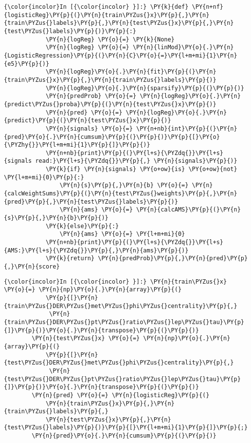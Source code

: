     \begin{Verbatim}[commandchars=\\\{\}]
{\color{incolor}In [{\color{incolor} }]:} \PY{k}{def} \PY{n+nf}{logisticReg}\PY{p}{(}\PY{n}{train\PYZus{}x}\PY{p}{,}\PY{n}{train\PYZus{}labels}\PY{p}{,}\PY{n}{test\PYZus{}x}\PY{p}{,}\PY{n}{test\PYZus{}labels}\PY{p}{)}\PY{p}{:}
            \PY{n}{logReg} \PY{o}{=} \PY{k}{None}
            \PY{n}{logReg} \PY{o}{=} \PY{n}{linMod}\PY{o}{.}\PY{n}{LogisticRegression}\PY{p}{(}\PY{n}{C}\PY{o}{=}\PY{l+m+mi}{1}\PY{n}{e5}\PY{p}{)}
            \PY{n}{logReg}\PY{o}{.}\PY{n}{fit}\PY{p}{(}\PY{n}{train\PYZus{}x}\PY{p}{,}\PY{n}{train\PYZus{}labels}\PY{p}{)}
            \PY{n}{logReg}\PY{o}{.}\PY{n}{sparsify}\PY{p}{(}\PY{p}{)}
            \PY{n}{predProb} \PY{o}{=} \PY{n}{logReg}\PY{o}{.}\PY{n}{predict\PYZus{}proba}\PY{p}{(}\PY{n}{test\PYZus{}x}\PY{p}{)}
            \PY{n}{pred} \PY{o}{=} \PY{n}{logReg}\PY{o}{.}\PY{n}{predict}\PY{p}{(}\PY{n}{test\PYZus{}x}\PY{p}{)}
            \PY{n}{signals} \PY{o}{=} \PY{n+nb}{int}\PY{p}{(}\PY{n}{pred}\PY{o}{.}\PY{n}{cumsum}\PY{p}{(}\PY{p}{)}\PY{p}{[}\PY{o}{\PYZhy{}}\PY{l+m+mi}{1}\PY{p}{]}\PY{p}{)}  
            \PY{n+nb}{print}\PY{p}{(}\PY{l+s}{\PYZdq{}}\PY{l+s}{signals read:}\PY{l+s}{\PYZdq{}}\PY{p}{,} \PY{n}{signals}\PY{p}{)}
            \PY{k}{if} \PY{n}{signals} \PY{o+ow}{is} \PY{o+ow}{not} \PY{l+m+mi}{0}\PY{p}{:}
                \PY{n}{s}\PY{p}{,}\PY{n}{b} \PY{o}{=} \PY{n}{calcWeightSums}\PY{p}{(}\PY{n}{test\PYZus{}weights}\PY{p}{,}\PY{n}{pred}\PY{p}{,}\PY{n}{test\PYZus{}labels}\PY{p}{)}
                \PY{n}{ams} \PY{o}{=} \PY{n}{calcAMS}\PY{p}{(}\PY{n}{s}\PY{p}{,}\PY{n}{b}\PY{p}{)}
            \PY{k}{else}\PY{p}{:}
                \PY{n}{ams} \PY{o}{=} \PY{l+m+mi}{0}
            \PY{n+nb}{print}\PY{p}{(}\PY{l+s}{\PYZdq{}}\PY{l+s}{AMS:}\PY{l+s}{\PYZdq{}}\PY{p}{,}\PY{n}{ams}\PY{p}{)}
            \PY{k}{return} \PY{n}{predProb}\PY{p}{,}\PY{n}{pred}\PY{p}{,}\PY{n}{score}
\end{Verbatim}

    \begin{Verbatim}[commandchars=\\\{\}]
{\color{incolor}In [{\color{incolor} }]:} \PY{n}{train\PYZus{}x} \PY{o}{=} \PY{n}{np}\PY{o}{.}\PY{n}{array}\PY{p}{(}
            \PY{p}{[}\PY{n}{train\PYZus{}DER\PYZus{}met\PYZus{}phi\PYZus{}centrality}\PY{p}{,}
             \PY{n}{train\PYZus{}DER\PYZus{}pt\PYZus{}ratio\PYZus{}lep\PYZus{}tau}\PY{p}{]}\PY{p}{)}\PY{o}{.}\PY{n}{transpose}\PY{p}{(}\PY{p}{)}
        \PY{n}{test\PYZus{}x} \PY{o}{=} \PY{n}{np}\PY{o}{.}\PY{n}{array}\PY{p}{(}
            \PY{p}{[}\PY{n}{test\PYZus{}DER\PYZus{}met\PYZus{}phi\PYZus{}centrality}\PY{p}{,}
             \PY{n}{test\PYZus{}DER\PYZus{}pt\PYZus{}ratio\PYZus{}lep\PYZus{}tau}\PY{p}{]}\PY{p}{)}\PY{o}{.}\PY{n}{transpose}\PY{p}{(}\PY{p}{)}
        \PY{n}{pred} \PY{o}{=} \PY{n}{logisticReg}\PY{p}{(}
            \PY{n}{train\PYZus{}x}\PY{p}{,}\PY{n}{train\PYZus{}labels}\PY{p}{,}
            \PY{n}{test\PYZus{}x}\PY{p}{,}\PY{n}{test\PYZus{}labels}\PY{p}{)}\PY{p}{[}\PY{l+m+mi}{1}\PY{p}{]}\PY{p}{;}
        \PY{n}{pred}\PY{o}{.}\PY{n}{cumsum}\PY{p}{(}\PY{p}{)}
\end{Verbatim}

